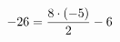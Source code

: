 \documentclass[preview]{standalone}
\begin{document}
\begin{align*}
\special{dvisvgm:raw <g id='unique000'>}-26 = \frac{8 \cdot (-5)}{2} - 6\special{dvisvgm:raw </g>}
\end{align*}
\end{document}

